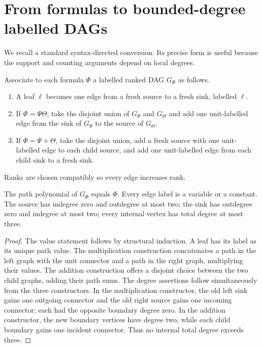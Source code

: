 \section{From formulas to bounded-degree labelled DAGs}\label{sec:formula-dag}

We recall a standard syntax-directed conversion.  Its precise form is useful because the
support and counting arguments depend on local degrees.

\begin{construction}\label{cons:dag}
Associate to each formula \(\Phi\) a labelled ranked DAG \(G_\Phi\) as follows.
\begin{enumerate}[label=(\roman*)]
\item A leaf \(\ell\) becomes one edge from a fresh source to a fresh sink, labelled
\(\ell\).
\item If \(\Phi=\Psi\Theta\), take the disjoint union of \(G_\Psi\) and \(G_\Theta\) and
add one unit-labelled edge from the sink of \(G_\Psi\) to the source of \(G_\Theta\).
\item If \(\Phi=\Psi+\Theta\), take the disjoint union, add a fresh source with one
unit-labelled edge to each child source, and add one unit-labelled edge from each child
sink to a fresh sink.
\end{enumerate}
Ranks are chosen compatibly so every edge increases rank.
\end{construction}

\begin{lemma}\label{lem:dag-properties}
The path polynomial of \(G_\Phi\) equals \(\Phi\).  Every edge label is a variable or a
constant.  The source has indegree zero and outdegree at most two; the sink has outdegree
zero and indegree at most two; every internal vertex has total degree at most three.
\end{lemma}

\begin{proof}
The value statement follows by structural induction.  A leaf has its label as its unique
path value.  The multiplication construction concatenates a path in the left graph with
the unit connector and a path in the right graph, multiplying their values.  The addition
construction offers a disjoint choice between the two child graphs, adding their path
sums.  The degree assertions follow simultaneously from the three constructors.  In the
multiplication constructor, the old left sink gains one outgoing connector and the old
right source gains one incoming connector; each had the opposite boundary degree zero.
In the addition constructor, the new boundary vertices have degree two, while each child
boundary gains one incident connector.  Thus no internal total degree exceeds three.
\end{proof}

